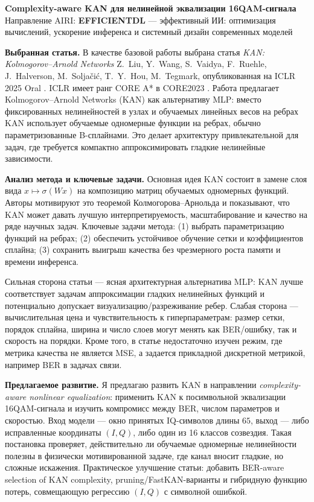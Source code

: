 \documentclass[11pt,a4paper]{article}
\begin{document}

\begin{center}
{\Large\bfseries Complexity-aware KAN для нелинейной эквализации 16QAM-сигнала}\\
\vspace{2mm}
Направление AIRI: \textbf{EFFICIENTDL} --- эффективный ИИ: оптимизация вычислений, ускорение инференса и системный дизайн современных моделей
\end{center}

\textbf{Выбранная статья.}
В качестве базовой работы выбрана статья \textit{KAN: Kolmogorov--Arnold Networks} Z.~Liu, Y.~Wang, S.~Vaidya, F.~Ruehle, J.~Halverson, M.~Soljačić, T.~Y.~Hou, M.~Tegmark, опубликованная на ICLR 2025 Oral \cite{kan}. ICLR имеет ранг CORE A* в CORE2023 \cite{core}. Работа предлагает Kolmogorov--Arnold Networks (KAN) как альтернативу MLP: вместо фиксированных нелинейностей в узлах и обучаемых линейных весов на ребрах KAN использует обучаемые одномерные функции на ребрах, обычно параметризованные B-сплайнами. Это делает архитектуру привлекательной для задач, где требуется компактно аппроксимировать гладкие нелинейные зависимости.

\textbf{Анализ метода и ключевые задачи.}
Основная идея KAN состоит в замене слоя вида \(x \mapsto \sigma(Wx)\) на композицию матриц обучаемых одномерных функций. Авторы мотивируют это теоремой Колмогорова--Арнольда и показывают, что KAN может давать лучшую интерпретируемость, масштабирование и качество на ряде научных задач. Ключевые задачи метода: (1) выбрать параметризацию функций на ребрах; (2) обеспечить устойчивое обучение сетки и коэффициентов сплайна; (3) сохранить выигрыш качества без чрезмерного роста памяти и времени инференса.

Сильная сторона статьи --- ясная архитектурная альтернатива MLP: KAN лучше соответствует задачам аппроксимации гладких нелинейных функций и потенциально допускает визуализацию/разреживание ребер. Слабая сторона --- вычислительная цена и чувствительность к гиперпараметрам: размер сетки, порядок сплайна, ширина и число слоев могут менять как BER/ошибку, так и скорость на порядки. Кроме того, в статье недостаточно изучен режим, где метрика качества не является MSE, а задается прикладной дискретной метрикой, например BER в задачах связи.

\textbf{Предлагаемое развитие.}
Я предлагаю развить KAN в направлении \textit{complexity-aware nonlinear equalization}: применить KAN к посимвольной эквализации 16QAM-сигнала и изучить компромисс между BER, числом параметров и скоростью. Вход модели --- окно принятых IQ-символов длины \(65\), выход --- либо исправленные координаты \((I,Q)\), либо один из 16 классов созвездия. Такая постановка проверяет, действительно ли обучаемые одномерные нелинейности полезны в физически мотивированной задаче, где канал вносит гладкие, но сложные искажения. Практическое улучшение статьи: добавить BER-aware selection of KAN complexity, pruning/FastKAN-варианты и гибридную функцию потерь, совмещающую регрессию \((I,Q)\) с символной ошибкой.
\end{document}
